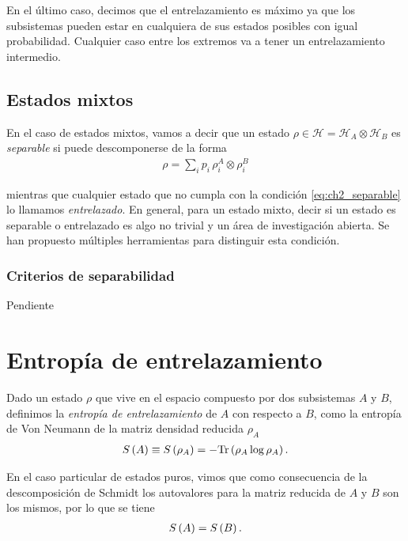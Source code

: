 \documentclass[../main.tex]{subfiles}
\begin{document}
En el último caso, decimos que el entrelazamiento es máximo ya que los subsistemas pueden estar en cualquiera de sus estados posibles con igual probabilidad. Cualquier caso entre los extremos va a tener un entrelazamiento intermedio.

\subsection{Estados mixtos}

En el caso de estados mixtos, vamos a decir que un estado $\rho \in \mathcal H = \mathcal H_A \otimes \mathcal H_B$ es \textit{separable} si puede descomponerse de la forma
\begin{align}
	\rho = \sum_i p_i\, \rho_i^A \otimes \rho_i^B
	\label{eq:ch2_separable}
\end{align}

\noindent mientras que cualquier estado que no cumpla con la condición \eqref{eq:ch2_separable} lo llamamos \textit{entrelazado}. En general, para un estado mixto, decir si un estado es separable o entrelazado es algo no trivial y un área de investigación abierta. Se han propuesto múltiples herramientas para distinguir esta condición.

\subsubsection{Criterios de separabilidad}
Pendiente

\section{Entropía de entrelazamiento}


Dado un estado $\rho$ que vive en el espacio compuesto por dos subsistemas $A$ y $B$, definimos la \textit{entropía de entrelazamiento} de $A$ con respecto a $B$, como la entropía de Von Neumann de la matriz densidad reducida $\rho_A$
\begin{align}
	S\left ( A \right ) \equiv S\left ( \rho_A \right ) = - \text{Tr}\left ( \rho_A \log \rho_A \right ).
\end{align}

En el caso particular de estados puros, vimos que como consecuencia de la descomposición de Schmidt los autovalores para la matriz reducida de $A$ y $B$ son los mismos, por lo que se tiene
\begin{align}
	S\left ( A \right ) = S\left ( B \right ).
\end{align}
\end{document}
